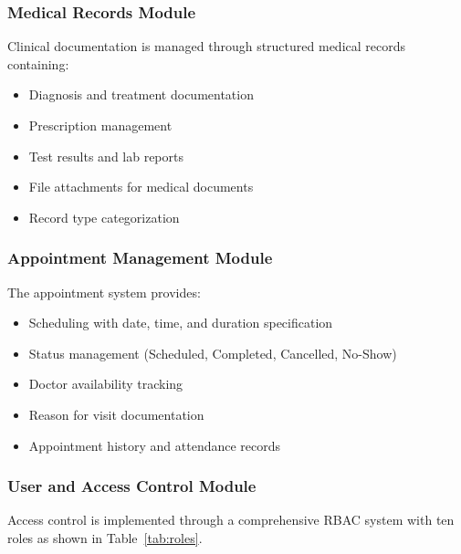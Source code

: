 \documentclass[conference]{IEEEtran}
\begin{document}
\subsubsection{Medical Records Module}
Clinical documentation is managed through structured medical records containing:
\begin{itemize}[leftmargin=*]
  \item Diagnosis and treatment documentation
  \item Prescription management
  \item Test results and lab reports
  \item File attachments for medical documents
  \item Record type categorization
\end{itemize}

\subsubsection{Appointment Management Module}
The appointment system provides:
\begin{itemize}[leftmargin=*]
  \item Scheduling with date, time, and duration specification
  \item Status management (Scheduled, Completed, Cancelled, No-Show)
  \item Doctor availability tracking
  \item Reason for visit documentation
  \item Appointment history and attendance records
\end{itemize}

\subsubsection{User and Access Control Module}
Access control is implemented through a comprehensive RBAC system with ten roles as shown in Table~\ref{tab:roles}.
\end{document}
